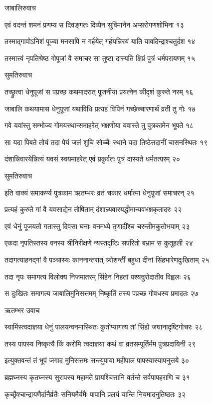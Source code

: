 जाबालिरुवाच

एवं वदन्तं शमनं प्रणम्य स दिवङ्गतः
दिव्येन सुविमानेन अप्सरोगणशोभिना १३

तस्माद्गावोऽनिशं पूज्या मनसापि न गर्हयेत्
गर्हयन्निरयं याति यावदिन्द्राश्चतुर्दश १४

तस्मात्त्वं नृपतिश्रेष्ठ गोपूजां वै समाचर
सा तुष्टा दास्यति क्षिप्रं पुत्रं धर्मपरायणम् १५

सुमतिरुवाच

तच्छ्रुत्वा धेनुपूजां स पप्रच्छ कथमादरात्
पूजनीया प्रयत्नेन कीदृशं कुरुते नरम् १६

जाबालि कथयामास धेनुपूजां यथाविधि
प्रत्यहं विपिनं गच्छेच्चारणार्थं व्रती तु गोः १७

गवे यवांस्तु सम्भोज्य गोमयस्थान्समाहरेत्
भक्षणीया यवास्ते तु पुत्रकामेन भूपते १८

सा यदा पिबते तोयं तदा पेयं जलं शुचि
सोच्चैः स्थाने यदा तिष्ठेत्तदानीं चासनस्थितः १९

दंशान्निवारयेन्नित्यं यवसं स्वयमाहरेत्
एवं प्रकुर्वतः पुत्रं दास्यते धर्मतत्परम् २०

सुमतिरुवाच

इति वाक्यं समाकर्ण्य पुत्रकाम ऋतम्भरः
व्रतं चकार धर्मात्मा धेनुपूजां समाचरन् २१

प्रत्यहं कुरुते गां वै यवसाद्येन तोषिताम्
दंशान्न्यवारयद्धीमान्यवभक्षकृतादरः २२

एवं धेनुं पूजयतो गतास्तु दिवसा घनाः
वनमध्ये तृणादींश्च चरन्तीमकुतोभयाम् २३

एकदा नृपतिस्तस्य वनस्य श्रीनिरीक्षणे
न्यस्तदृष्टिः सपरितो बभ्राम स कुतूहली २४

तदागत्याहनद्गां वै पञ्चास्यः काननान्तरात्
क्रोशन्तीं बहुधा दीनां सिंहभारेणदुःखिताम् २५

तदा नृपः समागत्य विलोक्य निजमातरम्
सिंहेन निहतां पश्यन्रुरोदातीव विह्वलः २६

स दुःखितः समागत्य जाबालिमुनिसत्तमम्
निष्कृतिं तस्य पप्रच्छ गोवधस्य प्रमादतः २७

ऋतम्भर उवाच

स्वामिंस्त्वदाज्ञया धेनुं पालयन्वनमास्थितः
कुतोप्यागत्य तां सिंहो जघानादृष्टिगोचरः २८

तस्य पापस्य निष्कृत्यै किं करोमि त्वदाज्ञया
कथं वा व्रतसम्पूर्तिर्मम पुत्रप्रदायिनी २९

इत्युक्तवन्तं तं भूपं जगाद मुनिसत्तमः
सन्त्युपाया महीपाल पापस्यास्यापनुत्तये ३०

ब्रह्मघ्नस्य कृतघ्नस्य सुरापस्य महामते
प्रायश्चित्तानि वर्तन्ते सर्वपापहराणि च ३१

कृच्छ्रैश्चान्द्रायणैर्दानैर्व्रतैः सनियमैर्यमैः
पापानि प्रलयं यान्ति नियमादनुतिष्ठतः ३२

